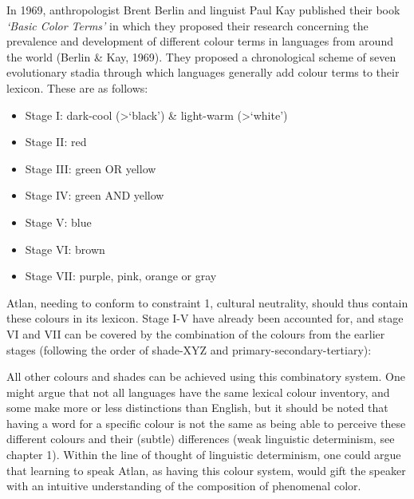 In 1969, anthropologist Brent Berlin and linguist Paul Kay published their book \textit{‘Basic Color Terms’} in which they proposed their research concerning the prevalence and development of different colour terms in languages from around the world (Berlin \& Kay, 1969). They proposed a chronological scheme of seven evolutionary stadia through which languages generally add colour terms to their lexicon. These are as follows: 

\begin{itemize}
\item Stage I: dark-cool (>‘black’) \& light-warm (>‘white’) 

\item Stage II: red 

\item Stage III:  green OR yellow 

\item Stage IV:  green AND yellow 

\item Stage V:  blue 

\item Stage VI:  brown 

\item Stage VII:  purple, pink, orange or gray 
\end{itemize}

Atlan, needing to conform to constraint 1, cultural neutrality, should thus contain these colours in its lexicon. Stage I-V have already been accounted for, and stage VI and VII can be covered by the combination of the colours from the earlier stages (following the order of shade-XYZ and primary-secondary-tertiary): 


All other colours and shades can be achieved using this combinatory system. One might argue that not all languages have the same lexical colour inventory, and some make more or less distinctions than English, but it should be noted that having a word for a specific colour is not the same as being able to perceive these different colours and their (subtle) differences (weak linguistic determinism, see chapter 1). Within the line of thought of linguistic determinism, one could argue that learning to speak Atlan, as having this colour system, would gift the speaker with an intuitive understanding of the composition of phenomenal color. 

